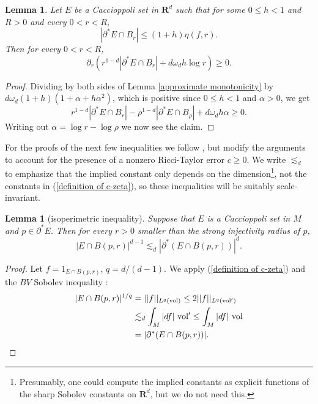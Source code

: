 \documentclass[reqno,12pt,letterpaper]{amsart}
\newcommand{\RR}{\mathbf{R}}
\newcommand{\vol}{\mathrm{vol}}
\newtheorem{lemma}[theorem]{Lemma}
\theoremstyle{definition}
\numberwithin{equation}{section}
\begin{document}
\begin{lemma}\label{approximate monotonicity 2}
Let $E$ be a Caccioppoli set in $\RR^d$ such that for some $0 \leq h < 1$ and $R > 0$ and every $0 < r < R$,
$$|\partial^* E \cap B_r| \leq (1 + h)\eta(f, r).$$
Then for every $0 < r < R$,
$$\partial_r \left(r^{1 - d} |\partial^* E \cap B_r| + d\omega_d h \log r\right) \geq 0.$$
\end{lemma}
\begin{proof}
Dividing by both sides of Lemma \ref{approximate monotonicity} by $d\omega_d(1 + h)(1 + \alpha + h\alpha^2)$, which is positive since $0 \leq h < 1$ and $\alpha > 0$, we get
$$r^{1 - d} |\partial^* E \cap B_r| - \rho^{1 - d} |\partial^* E \cap B_\rho| + d\omega_d h \alpha \geq 0.$$
Writing out $\alpha = \log r - \log \rho$ we now see the claim.
\end{proof}

For the proofs of the next few inequalities we follow \cite{Mooney11}, but modify the arguments to account for the presence of a nonzero Ricci-Taylor error $c \geq 0$.
We write $\lesssim_d$ to emphasize that the implied constant only depends on the dimension\footnote{Presumably, one could compute the implied constants as explicit functions of the sharp Sobolev constants on $\RR^d$, but we do not need this.}, not the constants in (\ref{definition of c-zeta}), so these inequalities will be suitably scale-invariant.

\begin{lemma}[isoperimetric inequality]\label{isoperimetric inequality}
Suppose that $E$ is a Caccioppoli set in $M$ and $p \in \partial^* E$.
Then for every $r > 0$ smaller than the strong injectivity radius of $p$,
$$|E \cap B(p, r)|^{d - 1} \lesssim_d |\partial^*(E \cap B(p, r))|^d.$$
\end{lemma}
\begin{proof}
Let $f = 1_{E \cap B(p, r)}$, $q = d/(d-1)$.
We apply (\ref{definition of c-zeta}) and the $BV$ Sobolev inequality \cite[\S5.6.1]{evans1991measure}:
\begin{align*}
|E \cap B(p, r)|^{1/q} &= ||f||_{L^q(\vol)} \leq 2||f||_{L^q(\vol')} \\
&\lesssim_d \int_M |df| ~\vol' \leq \int_M |df| ~\vol\\
&= |\partial^*(E \cap B(p, r))|. \qedhere
\end{align*}
\end{proof}
\end{document}
